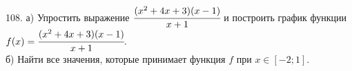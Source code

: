 108. а) Упростить выражение $\cfrac{(x^2+4x+3)(x-1)}{x+1}$ и построить график функции \\$f(x)=\cfrac{(x^2+4x+3)(x-1)}{x+1}.$\\
б) Найти все значения, которые принимает функция $f$ при $x\in[-2;1].$\\
